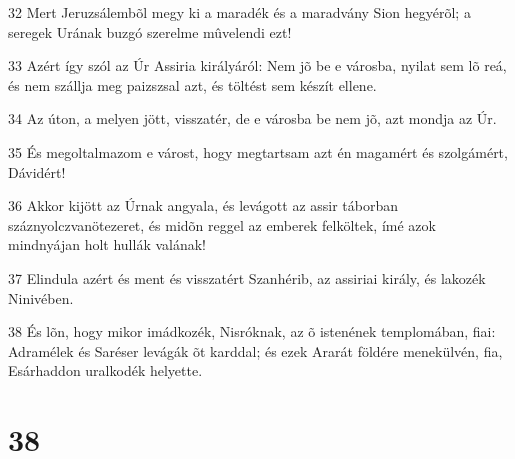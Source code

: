 \par 32 Mert Jeruzsálembõl megy ki a maradék és a maradvány Sion hegyérõl; a seregek Urának buzgó szerelme mûvelendi ezt!
\par 33 Azért így szól az Úr Assiria királyáról: Nem jõ be e városba, nyilat sem lõ reá, és nem szállja meg paizszsal azt, és töltést sem készít ellene.
\par 34 Az úton, a melyen jött, visszatér, de e városba be nem jõ, azt mondja az Úr.
\par 35 És megoltalmazom e várost, hogy megtartsam azt én magamért és szolgámért, Dávidért!
\par 36 Akkor kijött az Úrnak angyala, és levágott az assir táborban száznyolczvanötezeret, és midõn reggel az emberek felköltek, ímé azok mindnyájan holt hullák valának!
\par 37 Elindula azért és ment és visszatért Szanhérib, az assiriai király, és lakozék Ninivében.
\par 38 És lõn, hogy mikor imádkozék, Nisróknak, az õ istenének templomában, fiai: Adramélek és Saréser levágák õt karddal; és ezek Ararát földére menekülvén, fia, Esárhaddon uralkodék helyette.

\chapter{38}

